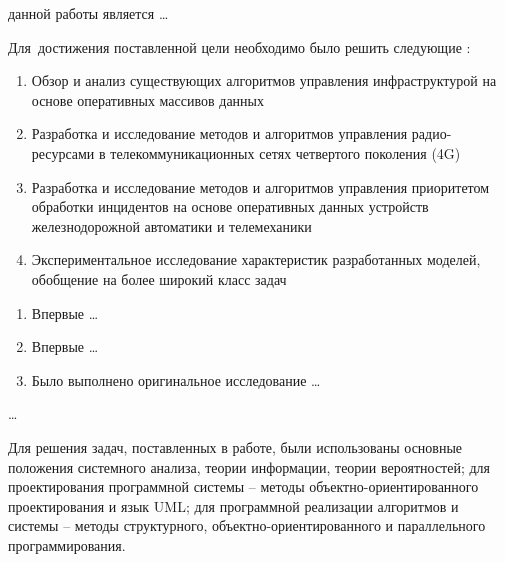 
{\aim} данной работы является \ldots

Для~достижения поставленной цели необходимо было решить следующие {\tasks}:
\begin{enumerate}
  \item Обзор и анализ существующих алгоритмов управления инфраструктурой на основе оперативных массивов данных
  \item Разработка и исследование методов и алгоритмов управления радио-ресурсами в телекоммуникационных сетях четвертого поколения (4G)
  \item Разработка и исследование методов и алгоритмов управления приоритетом обработки инцидентов на основе оперативных данных устройств железнодорожной автоматики и телемеханики
  \item Экспериментальное исследование характеристик разработанных моделей, обобщение на более широкий класс задач

\end{enumerate}

{\novelty}
\begin{enumerate}
  \item Впервые \ldots
  \item Впервые \ldots
  \item Было выполнено оригинальное исследование \ldots
\end{enumerate}

{\influence} \ldots

{\methods} Для решения задач, поставленных в работе, были использованы основные положения системного анализа, теории информации, теории вероятностей; для проектирования программной системы – методы объектно-ориентированного проектирования и язык UML; для программной реализации алгоритмов и системы – методы структурного, объектно-ориентированного и параллельного программирования.

